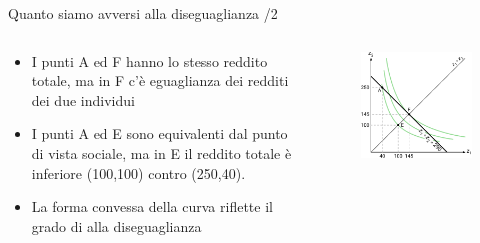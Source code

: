 \documentclass[aspectratio=64,12pt]{beamer}
\begin{document}
\begin{frame}{Quanto siamo avversi alla diseguaglianza /2}
\begin{columns}
\begin{column}{.5\columnwidth}
\begin{itemize}
\item I punti A ed F hanno lo stesso reddito totale, ma in F c'è eguaglianza dei
redditi dei due individui
\item I punti A ed E sono equivalenti dal punto di vista sociale, ma in E il
reddito totale è inferiore (100,100) contro (250,40).
\item La forma convessa della curva riflette il grado di alla diseguaglianza
\end{itemize}
\end{column}

\begin{column}{.5\columnwidth}
\begin{figure}[htbp]
\centering
\includegraphics[width=\textwidth]{./figure/fbs-color-4.pdf}
\end{figure}
\end{column}
\end{columns}
\end{frame}
\end{document}
